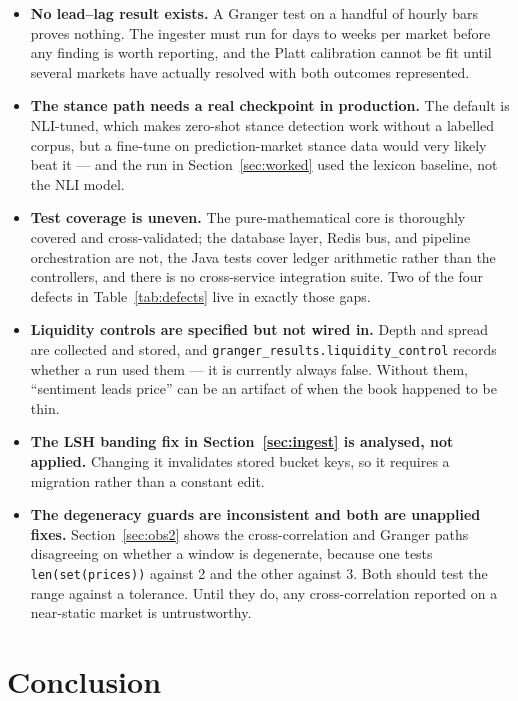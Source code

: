 \documentclass[11pt]{article}
\newcommand{\code}[1]{\texttt{\small #1}}
\begin{document}
\begin{itemize}\itemsep3pt
\item \textbf{No lead--lag result exists.} A Granger test on a handful of hourly
      bars proves nothing. The ingester must run for days to weeks per market
      before any finding is worth reporting, and the Platt calibration cannot be
      fit until several markets have actually resolved with both outcomes
      represented.
\item \textbf{The stance path needs a real checkpoint in production.} The
      default is NLI-tuned, which makes zero-shot stance detection work without a
      labelled corpus, but a fine-tune on prediction-market stance data would
      very likely beat it --- and the run in Section~\ref{sec:worked} used the
      lexicon baseline, not the NLI model.
\item \textbf{Test coverage is uneven.} The pure-mathematical core is thoroughly
      covered and cross-validated; the database layer, Redis bus, and pipeline
      orchestration are not, the Java tests cover ledger arithmetic rather than
      the controllers, and there is no cross-service integration suite. Two of
      the four defects in Table~\ref{tab:defects} live in exactly those gaps.
\item \textbf{Liquidity controls are specified but not wired in.} Depth and
      spread are collected and stored, and \code{granger\_results.liquidity\_control}
      records whether a run used them --- it is currently always false. Without
      them, ``sentiment leads price'' can be an artifact of when the book
      happened to be thin.
\item \textbf{The LSH banding fix in Section~\ref{sec:ingest} is analysed, not
      applied.} Changing it invalidates stored bucket keys, so it requires a
      migration rather than a constant edit.
\item \textbf{The degeneracy guards are inconsistent and both are unapplied
      fixes.} Section~\ref{sec:obs2} shows the cross-correlation and Granger
      paths disagreeing on whether a window is degenerate, because one tests
      \code{len(set(prices))} against 2 and the other against 3. Both should
      test the range against a tolerance. Until they do, any cross-correlation
      reported on a near-static market is untrustworthy.
\end{itemize}

\section{Conclusion}
\end{document}
